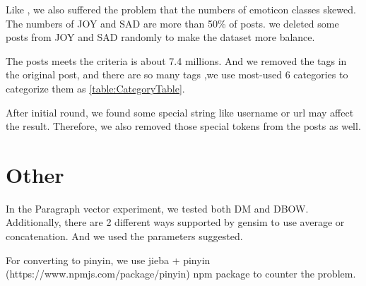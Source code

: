 Like \cite{zhao2012moodlens}, we also suffered the problem that the numbers of emoticon classes skewed. The numbers of JOY and SAD are more than 50\% of posts. 
we deleted some posts from JOY and SAD randomly to make the dataset more balance.  

The posts meets the criteria is about 7.4 millions. And we removed the tags in the original post, and there are so many tags 
,we use most-used 6 categories to categorize them as \ref{table:CategoryTable}.

After initial round, we found some special string like username or url may affect the result. Therefore, we also removed those special tokens from the posts as well.

\section{Other}

In the Paragraph vector experiment, we tested both DM and DBOW. Additionally, there are 2 different ways supported by gensim to use average or concatenation.
And we used the parameters suggested. 


For converting to pinyin, we use jieba + pinyin (https://www.npmjs.com/package/pinyin) npm package to counter the problem.
